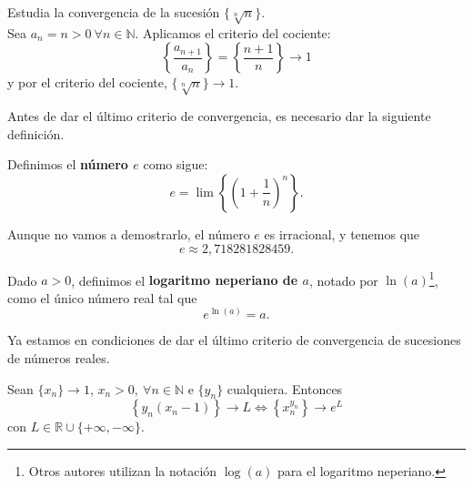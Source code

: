 \begin{ejemplo}
    Estudia la convergencia de la sucesión $\{\sqrt[n]{n}\}$.\\
    
    Sea $a_n = n > 0 ~ \forall n \in \mathbb{N}$. Aplicamos el criterio del cociente:
    \begin{equation*}
        \left\{\frac{a_{n+1}}{a_n}\right\} = \left\{\frac{n+1}{n}\right\} \longrightarrow 1
    \end{equation*}
    y por el criterio del cociente, $\{\sqrt[n]{n}\} \longrightarrow 1$.
\end{ejemplo}

Antes de dar el último criterio de convergencia, es necesario dar la siguiente definición.
\begin{definicion}
    Definimos el \textbf{número $e$} como sigue:
    \begin{equation*}
        e = \lim \left\{ \left(1 + \frac{1}{n}\right)^n\right\}.
    \end{equation*}
\end{definicion}

Aunque no vamos a demostrarlo, el número $e$ es irracional, y tenemos que
\begin{equation*}
    e \approx 2,718281828459.
\end{equation*}

Dado $a > 0$, definimos el \textbf{logaritmo neperiano de $a$}, notado por $\ln(a)$\footnote{Otros autores utilizan la notación $\log(a)$ para el logaritmo neperiano.}, como el único número real tal que
\begin{equation*}
    e^{\ln(a)} = a.
\end{equation*}

\bigskip
Ya estamos en condiciones de dar el último criterio de convergencia de sucesiones de números reales.
\begin{teo}

    Sean $\{x_n\} \longrightarrow 1$, $x_n > 0, ~ \forall n \in \mathbb{N}$ e $\{y_n\}$ cualquiera.
    Entonces
    \begin{equation*}
        \left\{ y_n(x_n -1) \right\} \longrightarrow L\Longleftrightarrow \left\{ x_n^{y_n} \right\} \longrightarrow e^L
    \end{equation*}
    con $L \in \mathbb{R} \cup \{+ \infty, -\infty\}$.
\end{teo}

